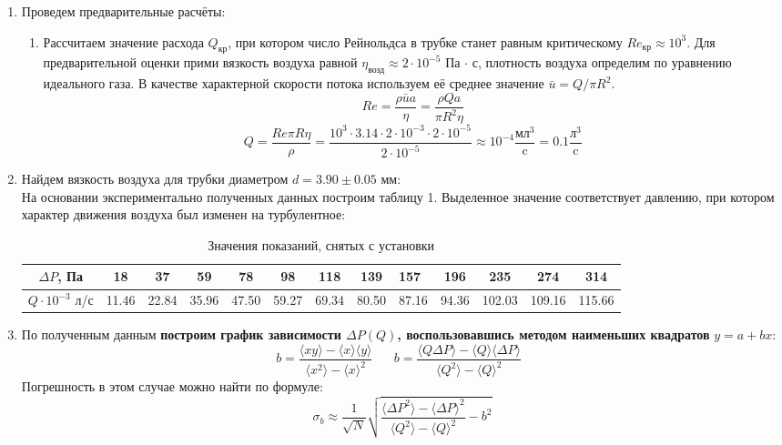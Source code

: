 \documentclass[a4paper,12pt]{article}
\begin{document}
\begin{enumerate}
\item Проведем предварительные расчёты:
	\begin{enumerate}
	\item Рассчитаем значение расхода $Q_{\text{кр}}$, при котором число Рейнольдса в трубке станет равным критическому $Re_{\text{кр}} \approx 10^3$. Для предварительной оценки прими вязкость воздуха равной $\eta_\text{возд} \approx 2 \cdot 10^{-5}$ Па $\cdot$ с, плотность воздуха определим по уравнению идеального газа. В качестве характерной скорости  потока используем её  среднее  значение $\bar{u} = Q/ \pi R^2$.
\[
Re = \frac{\rho \bar{u} a}{\eta} = \frac{\rho Qa}{\pi R^2 \eta}
\]
\[
Q = \frac{Re \pi R \eta}{\rho} = \frac{10^3 \cdot 3.14 \cdot 2 \cdot 10^{-3} \cdot 2 \cdot 10^{-5}}{2 \cdot 10^{-5}} \approx 10^{-4}\dfrac{\text{мл}^3}{\text{c}} = 0.1 
\dfrac{\text{л}^3}{\text{c}}
\]
\end{enumerate}
\item
Найдем вязкость воздуха для трубки диаметром $d = 3.90 \pm 0.05$ мм: \\
На основании экспериментально полученных данных построим таблицу 1. Выделенное значение соответствует давлению, при котором характер движения воздуха был изменен на турбулентное:
\begin{table}[h]
\setlength{\tabcolsep}{2pt}
\begin{tabular}{|c||c|c|c|c|c|c|c|g|c|c|c|c|}
\hline 
$\Delta P$, Па & 18 & 37 & 59 & 78 & 98 & 118 & 139 & 157 & 196 & 235 & 274 & 314 \\ 
\hline 
$Q \cdot 10^{-3}$ л/с & 11.46 & 22.84 & 35.96 & 47.50 & 59.27 & 69.34 & 80.50 & 87.16 & 94.36 & 102.03 & 109.16 & 115.66 \\ 
\hline 
\end{tabular} 
\caption{Значения показаний, снятых с установки}
\end{table}
\item
По полученным данным \textbf{построим график зависимости $\Delta P(Q)$, воспользовавшись методом наименьших квадратов} $y=a+bx$:
\begin{equation}
b = \frac{\langle xy \rangle - \langle x \rangle \langle y \rangle}{\langle x^2 \rangle - \langle x \rangle^2} \;\;\;\;\;\;
b = \frac{\langle Q \Delta P \rangle - \langle Q \rangle \langle \Delta P \rangle}{\langle Q^2 \rangle - \langle Q \rangle^2} \;\;
\label{mnk}
\end{equation}
Погрешность в этом случае можно найти по формуле: 
\begin{equation}
\sigma_b \approx \frac{1}{\sqrt{N}}\sqrt{\frac{\langle \Delta P ^2 \rangle - \langle \Delta P \rangle ^ 2}{\langle Q^2 \rangle - \langle Q \rangle ^ 2} - b^2} 

\end{equation}
\end{enumerate}
\end{document}
